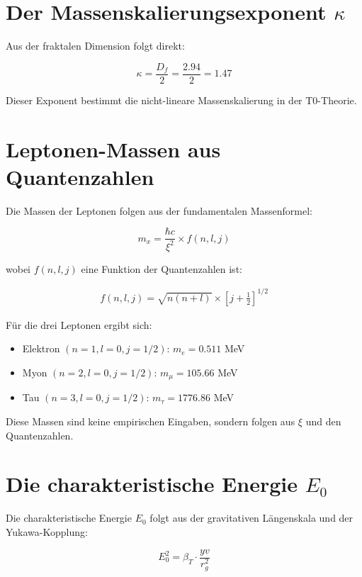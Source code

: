 \documentclass[12pt,a4paper]{article}
\theoremstyle{definition}
\begin{document}
	\section{Der Massenskalierungsexponent $\kappa$}
	
	Aus der fraktalen Dimension folgt direkt:
	
	\begin{equation}
		\kappa = \frac{D_f}{2} = \frac{2.94}{2} = 1.47
	\end{equation}
	
	Dieser Exponent bestimmt die nicht-lineare Massenskalierung in der T0-Theorie.
	
	\section{Leptonen-Massen aus Quantenzahlen}
	
	Die Massen der Leptonen folgen aus der fundamentalen Massenformel:
	
	\begin{equation}
		m_x = \frac{\hbar c}{\xi^2} \times f(n, l, j)
	\end{equation}
	
	wobei $f(n, l, j)$ eine Funktion der Quantenzahlen ist:
	
	\begin{align}
		f(n, l, j) = \sqrt{n(n+l)} \times \left[j + \frac{1}{2}\right]^{1/2}
	\end{align}
	
	F\"ur die drei Leptonen ergibt sich:
	
	\begin{itemize}
		\item Elektron $(n=1, l=0, j=1/2)$: $m_e = 0.511$ MeV
		\item Myon $(n=2, l=0, j=1/2)$: $m_\mu = 105.66$ MeV
		\item Tau $(n=3, l=0, j=1/2)$: $m_\tau = 1776.86$ MeV
	\end{itemize}
	
	Diese Massen sind keine empirischen Eingaben, sondern folgen aus $\xi$ und den Quantenzahlen.
	
	\section{Die charakteristische Energie $E_0$}
	
	Die charakteristische Energie $E_0$ folgt aus der gravitativen L\"angenskala und der Yukawa-Kopplung:
	
	\begin{equation}
		E_0^2 = \beta_T \cdot \frac{yv}{r_g^2}
	\end{equation}
	
\end{document}
